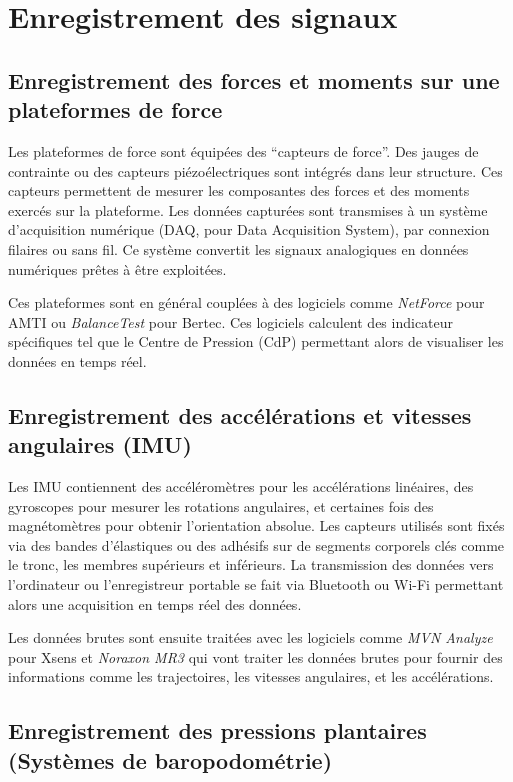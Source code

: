 \section{Enregistrement des signaux}

\subsection{Enregistrement des forces et moments sur une plateformes de force}

Les plateformes de force sont équipées des “capteurs de force”. 
Des jauges de contrainte ou des capteurs piézoélectriques sont intégrés dans leur structure.
Ces capteurs permettent de mesurer les composantes des forces et des moments exercés sur la plateforme.
Les données capturées sont transmises à un système d’acquisition numérique (DAQ, pour Data Acquisition System), par connexion filaires ou sans fil.
Ce système convertit les signaux analogiques en données numériques prêtes à être exploitées.

Ces plateformes sont en général couplées à des logiciels comme \textit{NetForce} pour AMTI ou \textit{BalanceTest} pour Bertec. 
Ces logiciels calculent des indicateur spécifiques tel que le Centre de Pression (CdP) permettant alors de visualiser les données en temps réel.

\subsection{Enregistrement des accélérations et vitesses angulaires (IMU)}

Les IMU contiennent des accéléromètres pour les accélérations linéaires, des gyroscopes pour mesurer les rotations angulaires, et certaines fois des magnétomètres pour obtenir l’orientation absolue.
Les capteurs utilisés sont fixés via des bandes d’élastiques ou des adhésifs sur de segments corporels clés comme le tronc, les membres supérieurs et inférieurs.
La transmission des données vers l’ordinateur ou l’enregistreur portable se fait via Bluetooth ou Wi-Fi permettant alors une acquisition en temps réel des données.

Les données brutes sont ensuite traitées avec les logiciels comme \textit{MVN Analyze} pour Xsens et \textit{Noraxon MR3} qui vont traiter les données brutes pour fournir des informations comme les trajectoires, les vitesses angulaires, et les accélérations.

\subsection{Enregistrement des pressions plantaires (Systèmes de baropodométrie)}

